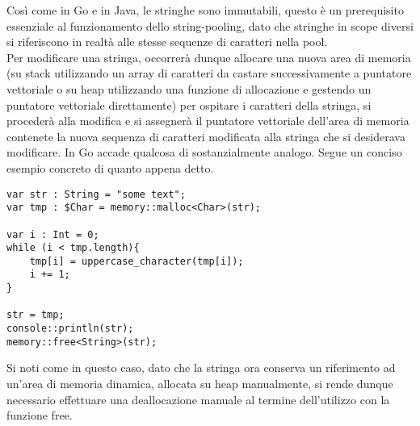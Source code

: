 Così come in Go e in Java, le stringhe sono immutabili, questo è un prerequisito essenziale al funzionamento dello string-pooling, dato 
che stringhe in scope diversi si riferiscono in realtà alle stesse sequenze di caratteri nella pool. \\

Per modificare una stringa, occorrerà dunque allocare una nuova area di memoria (su stack 
utilizzando un array di caratteri da castare successivamente a puntatore vettoriale o su heap utilizzando una 
funzione di allocazione e gestendo un puntatore vettoriale direttamente) per ospitare i caratteri della stringa, 
si procederà alla modifica e si assegnerà il puntatore vettoriale dell’area di memoria contenete la nuova sequenza 
di caratteri modificata alla stringa che si desiderava modificare. In Go accade qualcosa di sostanzialmente analogo. Segue un 
conciso esempio concreto di quanto appena detto. \\

\vspace{0.5cm}
\begin{lstlisting}[frame=single]
var str : String = "some text";
var tmp : $Char = memory::malloc<Char>(str);

var i : Int = 0;
while (i < tmp.length){
    tmp[i] = uppercase_character(tmp[i]);
    i += 1;
}

str = tmp;
console::println(str);
memory::free<String>(str);
\end{lstlisting}
\vspace{0.5cm}


Si noti come in questo caso, dato che la stringa ora conserva un riferimento ad un’area di memoria dinamica, allocata su heap 
manualmente, si rende dunque necessario effettuare una deallocazione manuale al termine dell’utilizzo con la funzione free. \\